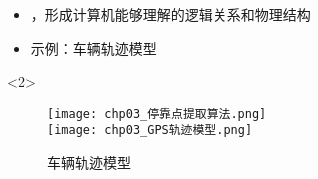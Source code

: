 \begin{frame}[t]{\subsecname}
\begin{itemize}
\item<1-> ，形成计算机能够理解的逻辑关系和物理结构
\item<2-> 示例：车辆轨迹模型 
\end{itemize}

\begin{overlayarea}{\textwidth}{\textheight}
  \begin{onlyenv}<2>
\begin{figure}
  \centering
  \texttt{[image: chp03\_停靠点提取算法.png]} \\
  \texttt{[image: chp03\_GPS轨迹模型.png]}
  \caption{车辆轨迹模型}
\end{figure}
  \end{onlyenv}
\end{overlayarea}
\end{frame}

